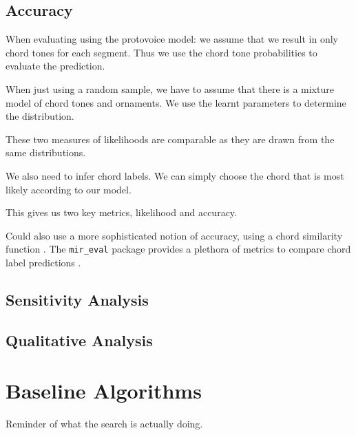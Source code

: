 \documentclass[12pt,a4paper,twoside,openright]{report}
\theoremstyle{definition}
\begin{document}
\subsection{Accuracy}
When evaluating using the protovoice model: we assume that we result in only chord tones for each segment. Thus we use the chord tone probabilities to evaluate the prediction. 
\par
When just using a random sample, we have to assume that there is a mixture model of chord tones and ornaments. We use the learnt parameters to determine the distribution.
\par
These two measures of likelihoods are comparable as they are drawn from the same distributions.
\par
We also need to infer chord labels. We can simply choose the chord that is most likely according to our model.
\par 
This gives us two key metrics, likelihood and accuracy.
\par
Could also use a more sophisticated notion of accuracy, using a chord similarity function \cite{humphreyFourTimelyInsights2015}. The {\texttt {mir\_eval}} package provides a plethora of metrics to compare chord label predictions \cite{raffelMirEvalTransparent2014}. 

\subsection{Sensitivity Analysis}

\subsection{Qualitative Analysis}

\section{Baseline Algorithms}
Reminder of what the search is actually doing. 
\end{document}
